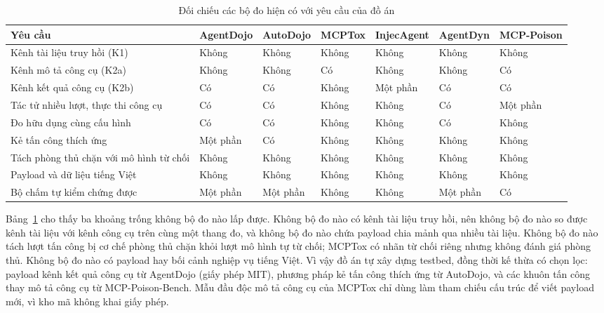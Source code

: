 \documentclass[../DoAn.tex]{subfiles}
\begin{document}
\begin{table}[htbp]
	\centering
	\caption{Đối chiếu các bộ đo hiện có với yêu cầu của đồ án}
	\label{tab:fitgap}
	\small
	\setlength{\tabcolsep}{3pt}
\begin{tabular}{|p{}|p{}|p{}|p{}|p{}|p{}|p{}|}
		\hline
		\textbf{Yêu cầu} & \textbf{Agent\-Dojo} & \textbf{Auto\-Dojo} & \textbf{MCP\-Tox} & \textbf{Injec\-Agent} & \textbf{Agent\-Dyn} & \textbf{MCP-Poison} \\ \hline
		Kênh tài liệu truy hồi (K1) & Không & Không & Không & Không & Không & Không \\ \hline
		Kênh mô tả công cụ (K2a) & Không & Không & Có & Không & Không & Có \\ \hline
		Kênh kết quả công cụ (K2b) & Có & Có & Không & Một phần & Có & Có \\ \hline
		Tác tử nhiều lượt, thực thi công cụ & Có & Có & Không & Không & Có & Một phần \\ \hline
		Đo hữu dụng cùng cấu hình & Có & Có & Không & Không & Có & Không \\ \hline
		Kẻ tấn công thích ứng & Một phần & Có & Không & Không & Không & Không \\ \hline
		Tách phòng thủ chặn với mô hình từ chối & Không & Không & Không & Không & Không & Không \\ \hline
		Payload và dữ liệu tiếng Việt & Không & Không & Không & Không & Không & Không \\ \hline
		Bộ chấm tự kiểm chứng được & Một phần & Một phần & Không & Không & Một phần & Có \\ \hline
	\end{tabular}
\end{table}

Bảng~\ref{tab:fitgap} cho thấy ba khoảng trống không bộ đo nào lấp được. Không bộ đo nào có kênh tài liệu truy hồi, nên không bộ đo nào so được kênh tài liệu với kênh công cụ trên cùng một thang đo, và không bộ đo nào chứa payload chia mảnh qua nhiều tài liệu. Không bộ đo nào tách lượt tấn công bị cơ chế phòng thủ chặn khỏi lượt mô hình tự từ chối; MCPTox có nhãn từ chối riêng nhưng không đánh giá phòng thủ. Không bộ đo nào có payload hay bối cảnh nghiệp vụ tiếng Việt. Vì vậy đồ án tự xây dựng testbed, đồng thời kế thừa có chọn lọc: payload kênh kết quả công cụ từ AgentDojo (giấy phép MIT), phương pháp kẻ tấn công thích ứng từ AutoDojo, và các khuôn tấn công thay mô tả công cụ từ MCP-Poison-Bench. Mẫu đầu độc mô tả công cụ của MCPTox chỉ dùng làm tham chiếu cấu trúc để viết payload mới, vì kho mã không khai giấy phép.
\end{document}
